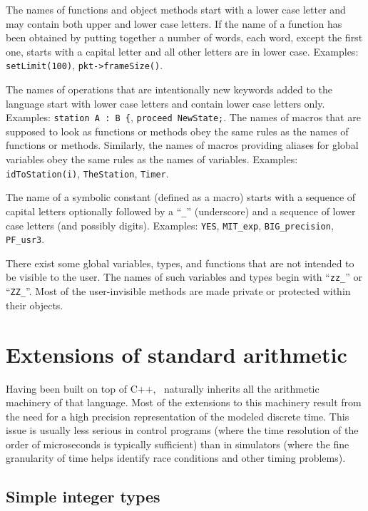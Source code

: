 The names of functions and object methods start with a lower case letter
and may contain both upper and lower case letters.
If the name of a function has been obtained by putting together a number of
words, each word, except the first one, starts with a capital letter and all
other letters are in lower case.
Examples: {\tt setLimit(100)}, {\tt pkt->frameSize()}.

The names of operations
that are intentionally new keywords added to the
language start with lower case letters and contain lower case letters only.
Examples: {\tt station~A~:~B~\{}, {\tt proceed~NewState;}.
The names of macros that are supposed to look as functions or methods
obey the same rules as the names of functions or methods.
Similarly, the names of macros providing aliases for global variables obey
the same rules as the names of variables.
Examples: {\tt idToStation(i)}, {\tt TheStation}, {\tt Timer}.

The name of a symbolic constant (defined as a macro) starts with a sequence of
capital letters optionally followed by a ``{\tt \_}'' (underscore) and a
sequence of lower case letters (and possibly digits).
Examples: {\tt YES}, {\tt MIT\_exp}, {\tt BIG\_precision}, {\tt PF\_usr3}.

There exist some global variables, types, and functions
that are not intended to be visible to the user.
The names of such variables and types begin with ``{\tt zz\_}'' or ``{\tt ZZ\_}''.
Most of the user-invisible methods are made private or protected
within their objects.

\section {Extensions of standard arithmetic}
\label {rm_mp}

Having been built on top of C++, \smurph\ naturally inherits all the
arithmetic machinery of that language.
Most of the extensions to this machinery result from the need for a
high precision representation of the modeled discrete time.
This issue is usually less serious in control programs (where the time
resolution of the order of microseconds is typically sufficient) than in
simulators (where the fine granularity of time helps identify race conditions
and other timing problems).

\subsection {Simple integer types}
\label {rm_mp_si}

